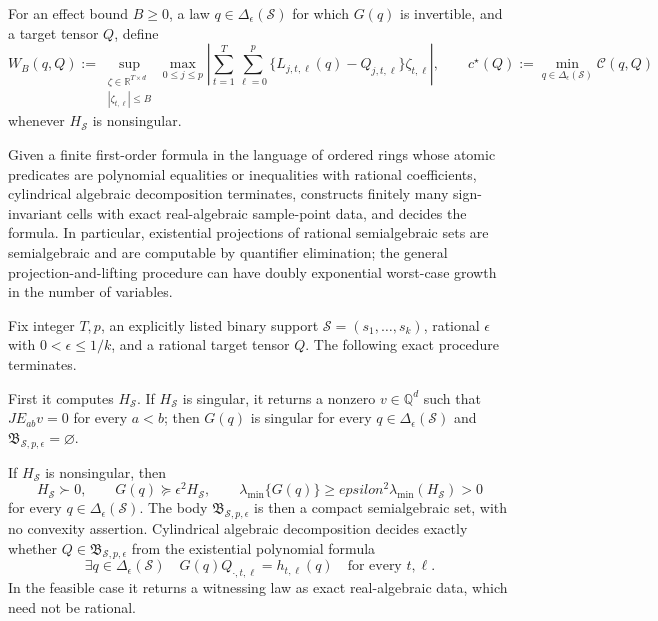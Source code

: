 For an effect bound \(B\geq0\), a law \(q\in\Delta_{\epsilon}(\mathcal S)\) for which \(G(q)\) is invertible, and a target tensor \(Q\), define
\[
 W_B(q,Q)
 :=\sup_{\substack{\zeta\in\mathbb R^{T\times d}\\
                    |\zeta_{t,\ell}|\leq B}}
       \max_{0\leq j\leq p}
       \left|\sum_{t=1}^T\sum_{\ell=0}^p
       \{L_{j,t,\ell}(q)-Q_{j,t,\ell}\}\zeta_{t,\ell}\right|,
 \qquad
 c^{\star}(Q):=\min_{q\in\Delta_{\epsilon}(\mathcal S)}\mathcal C(q,Q)
\]
whenever \(H_{\mathcal S}\) is nonsingular.

Given a finite first-order formula in the language of ordered rings whose atomic predicates are polynomial equalities or inequalities with rational coefficients, cylindrical algebraic decomposition terminates, constructs finitely many sign-invariant cells with exact real-algebraic sample-point data, and decides the formula.  In particular, existential projections of rational semialgebraic sets are semialgebraic and are computable by quantifier elimination; the general projection-and-lifting procedure can have doubly exponential worst-case growth in the number of variables.

Fix integer \(T,p\), an explicitly listed binary support \(\mathcal S=(s_1,\ldots,s_k)\), rational \(\epsilon\) with \(0<\epsilon\leq1/k\), and a rational target tensor \(Q\).  The following exact procedure terminates.

First it computes \(H_{\mathcal S}\).  If \(H_{\mathcal S}\) is singular, it returns a nonzero \(v\in\mathbb Q^d\) such that \(JE_{ab}v=0\) for every \(a<b\); then \(G(q)\) is singular for every \(q\in\Delta_{\epsilon}(\mathcal S)\) and \(\mathfrak B_{\mathcal S,p,\epsilon}=\varnothing\).

If \(H_{\mathcal S}\) is nonsingular, then
\[
 H_{\mathcal S}\succ0,
 \qquad
 G(q)\succeq\epsilon^2H_{\mathcal S},
 \qquad
 \lambda_{\min}\{G(q)\}\geq
 epsilon^2\lambda_{\min}(H_{\mathcal S})>0
\]
for every \(q\in\Delta_{\epsilon}(\mathcal S)\).  The body \(\mathfrak B_{\mathcal S,p,\epsilon}\) is then a compact semialgebraic set, with no convexity assertion.  Cylindrical algebraic decomposition decides exactly whether \(Q\in\mathfrak B_{\mathcal S,p,\epsilon}\) from the existential polynomial formula
\[
 \exists q\in\Delta_{\epsilon}(\mathcal S)\quad
 G(q)Q_{\cdot,t,\ell}=h_{t,\ell}(q)
 \quad\text{for every }t,\ell.
\]
In the feasible case it returns a witnessing law as exact real-algebraic data, which need not be rational.


